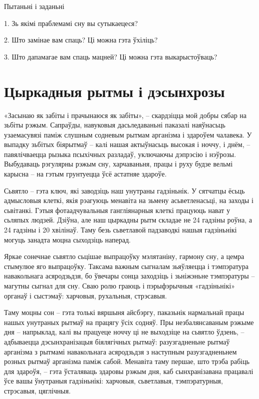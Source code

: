 Пытаньні і заданьні

1. Зь якімі праблемамі сну вы сутыкаецеся?

2. Што замінае вам спаць? Ці можна гэта ўхіліць?

3. Што дапамагае вам спаць мацней? Ці можна гэта выкарыстоўваць?


\section{Цыркадныя рытмы і дэсынхрозы}

«Засынаю як забіты і прачынаюся як забіты», – скардзіцца мой добры сябар на зьбіты рэжым. Сапраўды, навуковыя дасьледаваньні паказалі наяўнасьць узаемасувязі паміж слушным содневым рытмам арганізма і здароўем чалавека. У выпадку зьбітых біярытмаў – калі нашая актыўнасьць высокая і ноччу, і днём, – павялічваецца рызыка псыхічных разладаў, уключаючы дэпрэсію і нэўрозы. Выбудаваць рэгулярны рэжым сну, харчаваньня, працы і руху будзе вельмі карысна – на гэтым грунтуецца ўсё астатняе здароўе.

Сьвятло – гэта ключ, які заводзіць наш унутраны гадзіньнік. У сятчатцы ёсьць адмысловыя клеткі, якія рэагуюць менавіта на зьмену асьветленасьці, на заходы і сьвітанкі. Гэтыя фотаадчувальныя гангліянарныя клеткі працуюць нават у сьляпых людзей. Дзіўна, але наш цыркадны рытм складае не 24 гадзіны роўна, а 24 гадзіны і 20 хвілінаў. Таму безь сьветлавой падзаводкі нашыя гадзіньнікі могуць занадта моцна сыходзіць наперад.

Яркае сонечнае сьвятло сьцішае выпрацоўку мэлятаніну, гармону сну, а цемра стымулюе яго выпрацоўку. Таксама важным сыгналам зьяўляецца і тэмпэратура навакольнага асяродзьдзя, бо ўвечары сонца заходзіць і зьніжэньне тэмпэратуры – магутны сыгнал для сну. Сваю ролю граюць і пэрыфэрычныя «гадзіньнікі» органаў і сыстэмаў: харчовыя, рухальныя, стрэсавыя.

Таму моцны сон – гэта толькі вяршыня айсбэргу, паказьнік нармальнай працы нашых унутраных рытмаў на працягу ўсіх содняў. Пры незбалянсаваным рэжыме дня – напрыклад, калі вы працуеце ноччу ці не выходзіце на сьвятло ўдзень, – адбываецца дэсынхранізацыя біялягічных рытмаў: разузгадненьне рытмаў арганізма з рытмамі навакольнага асяродзьдзя з наступным разузгадненьнем розных рытмаў арганізма паміж сабой. Менавіта таму першае, што трэба рабіць для здароўя, – гэта ўсталяваць здаровы рэжым дня, каб сынхранізавана працавалі ўсе вашы ўнутраныя гадзіньнікі: харчовыя, сьветлавыя, тэмпэратурныя, стрэсавыя, цяглічныя.

